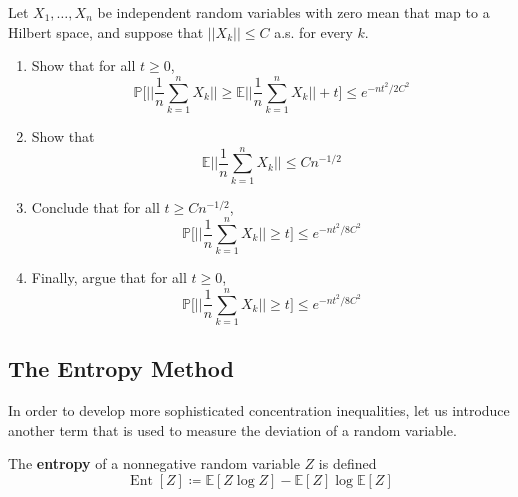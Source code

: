 \documentclass{article}
\DeclareMathOperator{\Ent}{Ent}
\begin{document}
\begin{exercise}
Let $X_1, \ldots, X_n$ be independent random variables with zero mean that map to a Hilbert space, and suppose that $||X_k|| \leq C$ a.s. for every $k$. 
\begin{enumerate}
    \item Show that for all $t \geq 0$, 
    \[\mathbb{P} \bigg[ \bigg| \bigg| \frac{1}{n} \sum_{k=1}^n X_k \bigg| \bigg| \geq \mathbb{E} \bigg| \bigg| \frac{1}{n} \sum_{k=1}^n X_k \bigg| \bigg| + t \bigg] \leq e^{-nt^2 / 2C^2} \]
    
    \item Show that 
    \[\mathbb{E} \bigg| \bigg| \frac{1}{n} \sum_{k=1}^n X_k \bigg| \bigg| \leq C n^{-1/2}\]
    
    \item Conclude that for all $t \geq C n^{-1/2}$, 
    \[\mathbb{P} \bigg[ \bigg| \bigg| \frac{1}{n} \sum_{k=1}^n X_k \bigg| \bigg| \geq t \bigg] \leq e^{-nt^2 / 8C^2}\]
    
    \item Finally, argue that for all $t \geq 0$, 
    \[\mathbb{P} \bigg[ \bigg| \bigg| \frac{1}{n} \sum_{k=1}^n X_k \bigg| \bigg| \geq t \bigg] \leq e^{-nt^2 / 8C^2}\]
\end{enumerate}
\end{exercise}

\subsection{The Entropy Method}

In order to develop more sophisticated concentration inequalities, let us introduce another term that is used to measure the deviation of a random variable. 

\begin{definition}[Entropy]
The \textbf{entropy} of a nonnegative random variable $Z$ is defined 
\[\Ent[Z] \coloneqq \mathbb{E}[Z \log Z] - \mathbb{E}[Z] \log \mathbb{E}[Z]\]
\end{definition}
\end{document}
